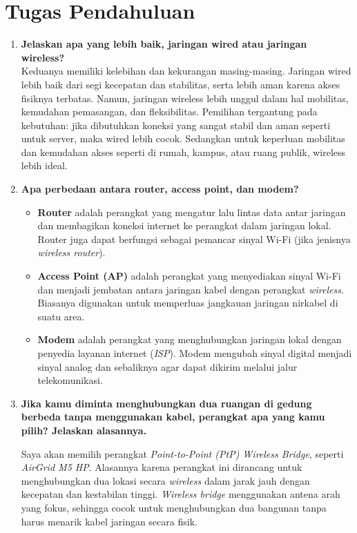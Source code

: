 \section{Tugas Pendahuluan}
\begin{enumerate}
 \item \textbf{Jelaskan apa yang lebih baik, jaringan wired atau jaringan wireless?}\\
    Keduanya memiliki kelebihan dan kekurangan masing-masing. Jaringan wired lebih baik dari segi kecepatan dan stabilitas, serta lebih aman karena akses fisiknya terbatas. Namun, jaringan wireless lebih unggul dalam hal mobilitas, kemudahan pemasangan, dan fleksibilitas. Pemilihan tergantung pada kebutuhan: jika dibutuhkan koneksi yang sangat stabil dan aman seperti untuk server, maka wired lebih cocok. Sedangkan untuk keperluan mobilitas dan kemudahan akses seperti di rumah, kampus, atau ruang publik, wireless lebih ideal.

    \item \textbf{Apa perbedaan antara router, access point, dan modem?}\\
    
    \begin{itemize}
    \item \textbf{Router} adalah perangkat yang mengatur lalu lintas data antar jaringan dan membagikan koneksi internet ke perangkat dalam jaringan lokal. Router juga dapat berfungsi sebagai pemancar sinyal Wi-Fi (jika jenisnya \textit{wireless router}).
    
    \item \textbf{Access Point (AP)} adalah perangkat yang menyediakan sinyal Wi-Fi dan menjadi jembatan antara jaringan kabel dengan perangkat \textit{wireless}. Biasanya digunakan untuk memperluas jangkauan jaringan nirkabel di suatu area.
    
    \item \textbf{Modem} adalah perangkat yang menghubungkan jaringan lokal dengan penyedia layanan internet (\textit{ISP}). Modem mengubah sinyal digital menjadi sinyal analog dan sebaliknya agar dapat dikirim melalui jalur telekomunikasi.
    \end{itemize}


    \item \textbf{Jika kamu diminta menghubungkan dua ruangan di gedung berbeda tanpa menggunakan kabel, perangkat apa yang kamu pilih? Jelaskan alasannya.}
    
    Saya akan memilih perangkat \textit{Point-to-Point (PtP) Wireless Bridge}, seperti \textit{AirGrid M5 HP}. Alasannya karena perangkat ini dirancang untuk menghubungkan dua lokasi secara \textit{wireless} dalam jarak jauh dengan kecepatan dan kestabilan tinggi. \textit{Wireless bridge} menggunakan antena arah yang fokus, sehingga cocok untuk menghubungkan dua bangunan tanpa harus menarik kabel jaringan secara fisik.
\end{enumerate}